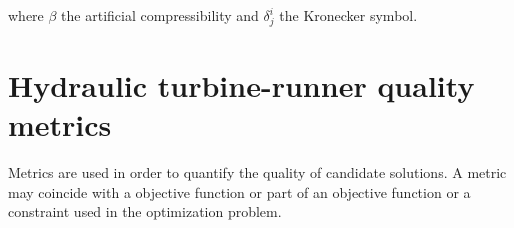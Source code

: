 where $\beta$ the artificial compressibility \cite{Chorin,Turkel87} and $\delta^i_j$ the Kronecker symbol.


 








\section{Hydraulic turbine-runner quality metrics}
\label{metrics}
Metrics are used in order to quantify the quality of candidate solutions. A metric may coincide with a objective function or part of an objective function or a constraint used in the optimization problem.

